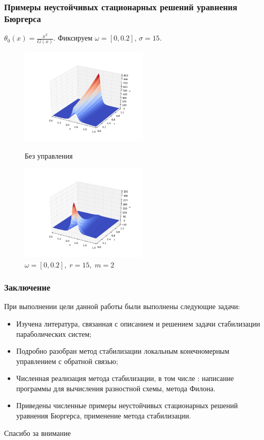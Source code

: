 \documentclass{beamer}
\begin{document}
\begin{frame}
\frametitle{Примеры неустойчивых стационарных решений уравнения Бюргерса}

$\theta_0(x) = \frac{x^2}{G(x)}$. Фиксируем $\omega = [0, 0.2]$, $\sigma = 15$. 


\begin{figure}[H]
\centering
\begin{minipage}{.5\textwidth}
  \centering
  \includegraphics[width=2.4in]{ex_x2_s15}
  \caption{Без управления}
  \label{fig:test1}
\end{minipage}%
\begin{minipage}{.5\textwidth}
  \centering
  \includegraphics[width=2.4in]{re_x2_s15}
  \caption{$\omega = [0, 0.2], \; r = 15, \; m = 2$}
  \label{fig:test2}
\end{minipage}
\end{figure}



\end{frame}


\begin{frame}
\frametitle{Заключение}

При выполнении цели данной работы были выполнены следующие задачи:
\begin{itemize}
	 \item Изучена литература, связанная с описанием и решением задачи стабилизации параболических систем;
  \item Подробно разобран метод стабилизации локальным конечномерным управлением с обратной связью;
  \item Численная реализация метода стабилизации, в том числе : написание программы для вычисления разностной схемы, метода Филона.
  \item Приведены численные примеры неустойчивых стационарных решений уравнения Бюргерса, применение метода стабилизации.
\end{itemize}

\end{frame}

\begin{frame}
	\begin{center}
	\Huge Спасибо за внимание
	\end{center}
\end{frame}
\end{document}
